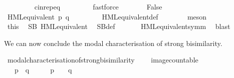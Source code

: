 \begin{isabellebody}
\ \ \ \ \ \ \isamarkupfalse%
\ {\isacharasterisk}{\kern0pt}{\isacharparenleft}{\kern0pt}{}{\isacharcomma}{\kern0pt}{}{\isacharparenright}{\kern0pt}\ cin{\isachardot}{\kern0pt}rep{\isacharunderscore}{\kern0pt}eq\ \isanewline
\ \ \ \ \ \ \isamarkupfalse%
\ fastforce\isanewline
\isanewline
\ \ \ \ \isamarkupfalse%
\ \isamarkupfalse%
\ False\ \isanewline
\ \ \ \ \ \ \isamarkupfalse%
\ {\isacartoucheopen}HML{\isacharunderscore}{\kern0pt}equivalent\ p\ q{\isacartoucheclose}\ \isanewline
\ \ \ \ \ \ \isamarkupfalse%
\ HML{\isacharunderscore}{\kern0pt}equivalent{\isacharunderscore}{\kern0pt}def\isanewline
\ \ \ \ \ \ \isamarkupfalse%
\ meson\isanewline
\ \ \isacommand{{\isacharbraceright}{\kern0pt}}\isamarkupfalse%
\isanewline
\isanewline
\ \ %
\isanewline
\ \ %
\isanewline
\ \ \isamarkupfalse%
\ this\ \isamarkupfalse%
\ {\isacartoucheopen}SB\ HML{\isacharunderscore}{\kern0pt}equivalent{\isacartoucheclose}\ \isamarkupfalse%
\ SB{\isacharunderscore}{\kern0pt}def\ \isanewline
\ \ \ \ \isamarkupfalse%
\ HML{\isacharunderscore}{\kern0pt}equivalent{\isacharunderscore}{\kern0pt}symm\ \isamarkupfalse%
\ blast\isanewline
{}\isamarkupfalse%
%
\endisatagvisible
{\isafoldvisible}%
%
\isadelimvisible
%
\endisadelimvisible
%
\begin{isamarkuptext}%
We can now conclude the modal characterisation of strong bisimilarity.%
\end{isamarkuptext}\isamarkuptrue%
%
\isadelimvisible
%
\endisadelimvisible
%
\isatagvisible
{}\isamarkupfalse%
\ modal{\isacharunderscore}{\kern0pt}characterisation{\isacharunderscore}{\kern0pt}of{\isacharunderscore}{\kern0pt}strong{\isacharunderscore}{\kern0pt}bisimilarity{\isacharcolon}{\kern0pt}\ \isanewline
\ \ \ {\isacartoucheopen}image{\isacharunderscore}{\kern0pt}countable{\isacartoucheclose}\isanewline
\ \ \ {\isacartoucheopen}{\isacharparenleft}{\kern0pt}p\ {\isasymleftrightarrow}\ q{\isacharparenright}{\kern0pt}\ \ {\isasymLongleftrightarrow}\ \ {\isacharparenleft}{\kern0pt}{\isasymforall}\ {\isasymphi}{\isachardot}{\kern0pt}\ p\ {\isasymTurnstile}\ {\isasymphi}\ {\isasymlongleftrightarrow}\ q\ {\isasymTurnstile}\ {\isasymphi}{\isacharparenright}{\kern0pt}{\isacartoucheclose}\isanewline

\end{isabellebody}
